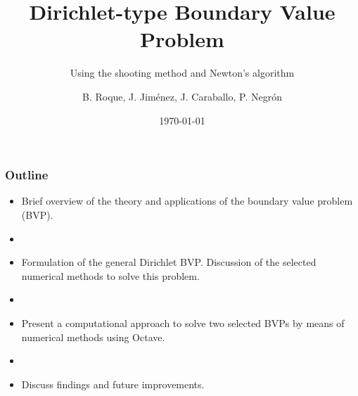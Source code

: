 \documentclass{beamer}
\begin{document}
\title{Dirichlet-type Boundary Value Problem}
\subtitle{Using the shooting method and Newton's algorithm}


\author{B. Roque, J. Jiménez, J. Caraballo, P. Negr\'{o}n}
\date{\today}

\begin{frame}
\titlepage
\end{frame}

\begin{frame}
\frametitle{Outline}
\begin{itemize}
    \item Brief overview of the theory and applications of the boundary value problem (BVP).
    \item[] %
    \item Formulation of the general Dirichlet BVP. Discussion of the selected numerical methods to solve this problem.
    \item[] %
    \item Present a computational approach to solve two selected BVPs by means of numerical methods using Octave.
    \item[] %
    \item Discuss findings and future improvements.
\end{itemize}
\end{frame}
\end{document}
